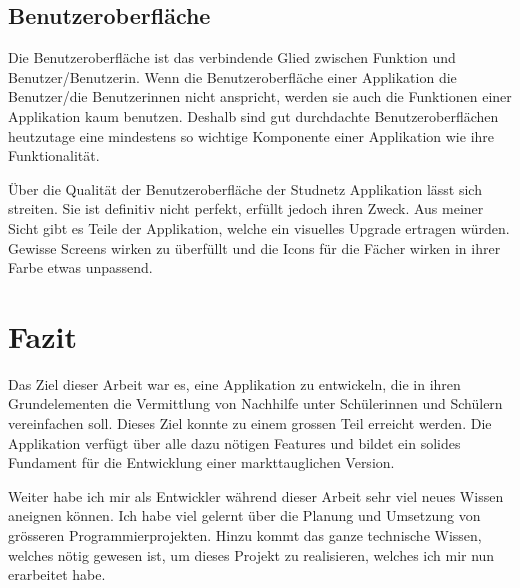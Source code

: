 \documentclass[../main.tex]{subfiles}
\begin{document}
	\subsection*{Benutzeroberfläche}
	Die Benutzeroberfläche ist das verbindende Glied zwischen Funktion und Benutzer/Benutzerin. Wenn die Benutzeroberfläche einer Applikation die Benutzer/die Benutzerinnen nicht anspricht, werden sie auch die Funktionen einer Applikation kaum benutzen. Deshalb sind gut durchdachte Benutzeroberflächen heutzutage eine mindestens so wichtige Komponente einer Applikation wie ihre Funktionalität.
	
	Über die Qualität der Benutzeroberfläche der Studnetz Applikation lässt sich streiten. Sie ist definitiv nicht perfekt, erfüllt jedoch ihren Zweck. Aus meiner Sicht gibt es Teile der Applikation, welche ein visuelles Upgrade ertragen würden. Gewisse Screens wirken zu überfüllt und die Icons für die Fächer wirken in ihrer Farbe etwas unpassend.
	
	\section{Fazit}
	Das Ziel dieser Arbeit war es, eine Applikation zu entwickeln, die in ihren Grundelementen die Vermittlung von Nachhilfe unter Schülerinnen und Schülern vereinfachen soll. Dieses Ziel konnte zu einem grossen Teil erreicht werden. Die Applikation verfügt über alle dazu nötigen Features und bildet ein solides Fundament für die Entwicklung einer markttauglichen Version.
	
	Weiter habe ich mir als Entwickler während dieser Arbeit sehr viel neues Wissen aneignen können. Ich habe viel gelernt über die Planung und Umsetzung von grösseren Programmierprojekten. Hinzu kommt das ganze technische  Wissen, welches nötig gewesen ist, um dieses Projekt zu realisieren, welches ich mir nun erarbeitet habe.
\end{document}
